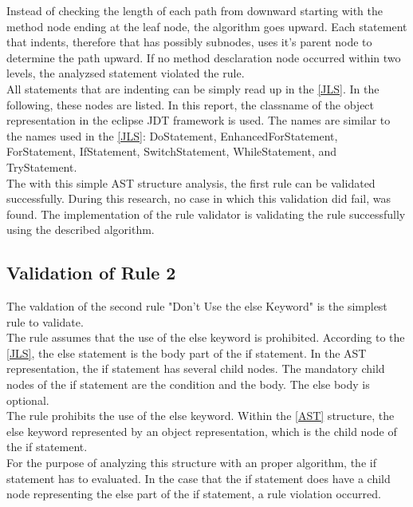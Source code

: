 Instead of checking the length of each path from downward starting with the method node ending at the leaf node, the algorithm goes upward. 
Each statement that indents, therefore that has possibly subnodes, uses it's parent node to determine the path upward. If no method desclaration node occurred within two levels, the analyzsed statement violated the rule. 
\\

All statements that are indenting can be simply read up in the \ref{JLS}. In the following, these nodes are listed. In this report, the classname of the object representation in the eclipse \acf{JDT} framework is used. The names are similar to the names used in the \ref{JLS}: DoStatement, EnhancedForStatement, ForStatement, IfStatement, SwitchStatement, WhileStatement, and TryStatement. 
\\

The with this simple \acf{AST} structure analysis, the first rule can be validated successfully. During this research, no case in which this validation did fail, was found. The implementation of the rule validator is validating the rule successfully using the described algorithm.

\subsection*{Validation of Rule 2}
The valdation of the second rule "Don’t Use the else Keyword" is the simplest rule to validate.
\\

The rule assumes that the use of the else keyword is prohibited. According to the \ref{JLS}, the else statement is the body part of the if statement. In the \acf{AST} representation, the if statement has several child nodes. The mandatory child nodes of the if statement are the condition and the body. The else body is optional. 
\\

The rule prohibits the use of the else keyword. Within the \ref{AST} structure, the else keyword represented by an object representation, which is the child node of the if statement.
\\

For the purpose of analyzing this structure with an proper algorithm, the if statement has to evaluated. In the case that the if statement does have a child node representing the else part of the if statement, a rule violation occurred.
\\

